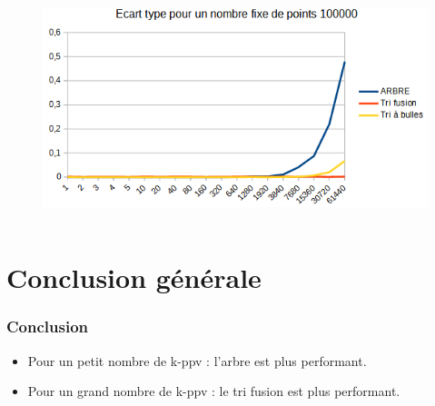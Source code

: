 \documentclass{beamer}
\begin{document}
\begin{frame}
\begin{columns}
    \begin{figure}
      \includegraphics[width=\textwidth]{Beamer/ET_NB_100000.png}
    \end{figure}
\end{columns}
\end{frame}

\section{ Conclusion générale}

\begin{frame}
\frametitle{Conclusion}
\begin{itemize}
    \setlength\itemsep{3em}
    \item[{\color{blue}\textbullet}] Pour un petit nombre de k-ppv : l'arbre est plus performant.
    \item[{\color{blue}\textbullet}] Pour un grand nombre de k-ppv : le tri fusion est plus performant.
\end{itemize}
\end{frame}
\end{document}
